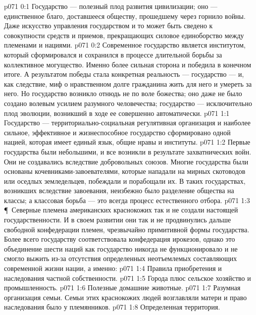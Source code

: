 \author{Мелхиседек}
\vs p071 0:1 Государство --- полезный плод развития цивилизации; оно --- единственное благо, доставшееся обществу, прошедшему через горнило войны. Даже искусство управления государством и то может быть сведено к совокупности средств и приемов, прекращающих силовое единоборство между племенами и нациями.
\vs p071 0:2 Современное государство является институтом, который сформировался и сохранился в процессе длительной борьбы за коллективное могущество. Именно более сильная сторона и победила в конечном итоге. А результатом победы стала конкретная реальность --- государство --- и, как следствие, миф о нравственном долге гражданина жить для него и умереть за него. Но государство возникло отнюдь не по воле божества; оно даже не было создано волевым усилием разумного человечества; государство --- исключительно плод эволюции, возникший в ходе ее совершенно автоматически.
\vs p071 1:1 Государство --- территориально\hyp{}социальная регулятивная организация и наиболее сильное, эффективное и жизнеспособное государство сформировано одной нацией, которая имеет единый язык, общие нравы и институты.
\vs p071 1:2 Первые государства были небольшими, и все возникли в результате захватнических войн. Они не создавались вследствие добровольных союзов. Многие государства были основаны кочевниками\hyp{}завоевателями, которые нападали на мирных скотоводов или оседлых земледельцев, побеждали и порабощали их. В таких государствах, возникших вследствие завоевания, неизбежно было разделение общества на классы; а классовая борьба --- это всегда процесс естественного отбора.
\vs p071 1:3 \P\ Северные племена американских краснокожих так и не создали настоящей государственности. И в своем развитии они так и не продвинулись дальше свободной конфедерации племен, чрезвычайно примитивной формы государства. Более всего государству соответствовала конфедерация ирокезов, однако это объединение шести наций как государство никогда не функционировало и не смогло выжить из\hyp{}за отсутствия определенных неотъемлемых составляющих современной жизни нации, а именно:
\vs p071 1:4 \bibnobreakspace Правила приобретения и наследования частной собственности.
\vs p071 1:5 \bibnobreakspace Города плюс сельское хозяйство и промышленность.
\vs p071 1:6 \bibnobreakspace Полезные домашние животные.
\vs p071 1:7 \bibnobreakspace Разумная организация семьи. Семьи этих краснокожих людей возглавляли матери и право наследования было у племянников.
\vs p071 1:8 \bibnobreakspace Определенная территория.
